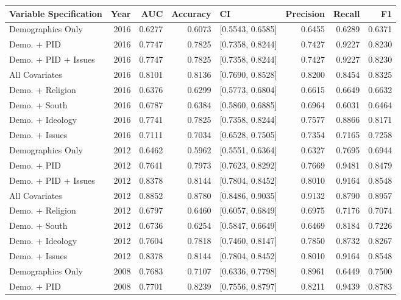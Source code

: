 \begin{longtable}{lrrrlrrr}
  \toprule
Variable Specification & Year & AUC & Accuracy & CI & Precision & Recall & F1 \\ 
  \midrule
Demographics Only & 2016 & 0.6277 & 0.6073 & [0.5543, 0.6585] & 0.6455 & 0.6289 & 0.6371 \\ 
  Demo. + PID & 2016 & 0.7747 & 0.7825 & [0.7358, 0.8244] & 0.7427 & 0.9227 & 0.8230 \\ 
  Demo. + PID + Issues & 2016 & 0.7747 & 0.7825 & [0.7358, 0.8244] & 0.7427 & 0.9227 & 0.8230 \\ 
  All Covariates & 2016 & 0.8101 & 0.8136 & [0.7690, 0.8528] & 0.8200 & 0.8454 & 0.8325 \\ 
  Demo. + Religion & 2016 & 0.6376 & 0.6299 & [0.5773, 0.6804] & 0.6615 & 0.6649 & 0.6632 \\ 
  Demo. + South & 2016 & 0.6787 & 0.6384 & [0.5860, 0.6885] & 0.6964 & 0.6031 & 0.6464 \\ 
  Demo. + Ideology & 2016 & 0.7741 & 0.7825 & [0.7358, 0.8244] & 0.7577 & 0.8866 & 0.8171 \\ 
  Demo. + Issues & 2016 & 0.7111 & 0.7034 & [0.6528, 0.7505] & 0.7354 & 0.7165 & 0.7258 \\ 
  Demographics Only & 2012 & 0.6462 & 0.5962 & [0.5551, 0.6364] & 0.6327 & 0.7695 & 0.6944 \\ 
  Demo. + PID & 2012 & 0.7641 & 0.7973 & [0.7623, 0.8292] & 0.7669 & 0.9481 & 0.8479 \\ 
  Demo. + PID + Issues & 2012 & 0.8378 & 0.8144 & [0.7804, 0.8452] & 0.8010 & 0.9164 & 0.8548 \\ 
  All Covariates & 2012 & 0.8852 & 0.8780 & [0.8486, 0.9035] & 0.9132 & 0.8790 & 0.8957 \\ 
  Demo. + Religion & 2012 & 0.6797 & 0.6460 & [0.6057, 0.6849] & 0.6975 & 0.7176 & 0.7074 \\ 
  Demo. + South & 2012 & 0.6736 & 0.6254 & [0.5847, 0.6649] & 0.6469 & 0.8184 & 0.7226 \\ 
  Demo. + Ideology & 2012 & 0.7604 & 0.7818 & [0.7460, 0.8147] & 0.7850 & 0.8732 & 0.8267 \\ 
  Demo. + Issues & 2012 & 0.8378 & 0.8144 & [0.7804, 0.8452] & 0.8010 & 0.9164 & 0.8548 \\ 
  Demographics Only & 2008 & 0.7683 & 0.7107 & [0.6336, 0.7798] & 0.8961 & 0.6449 & 0.7500 \\ 
  Demo. + PID & 2008 & 0.7701 & 0.8239 & [0.7556, 0.8797] & 0.8211 & 0.9439 & 0.8783 \\ 

\end{longtable}

